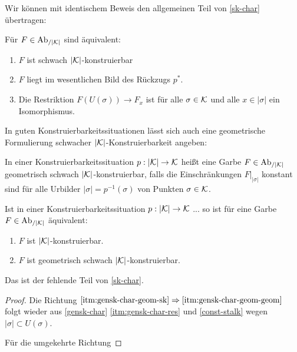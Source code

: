 Wir können mit identischem Beweis den allgemeinen Teil von
\ref{sk-char} übertragen:
\begin{prop} \label{gensk-char}
  Für $F \in \operatorname{Ab}_{/|\mathcal{K}|}$ sind äquivalent:
  \begin{enumerate}[label=(\arabic*)]
  \item \label{itm:gensk-char-sk} $F$ ist schwach $|\mathcal{K}|$-konstruierbar
  \item \label{itm:gensk-char-essim} $F$ liegt im wesentlichen Bild
    des Rückzugs $p^*$.
  \item \label{itm:gensk-char-res} Die Restriktion $F(U(\sigma)) \to
    F_x$ ist für alle $\sigma \in \mathcal{K}$ und alle $x \in |\sigma|$ ein
    Isomorphismus.
  \end{enumerate}
\end{prop}

In guten Konstruierbarkeitssituationen lässt sich auch eine
geometrische Formulierung schwacher $|\mathcal{K}|$-Konstruierbarkeit angeben:
\begin{defn}
  In einer Konstruierbarkeitssituation $p: |\mathcal{K}| \to \mathcal{K}$ heißt eine
  Garbe $F \in \operatorname{Ab}_{/|\mathcal{K}|}$ geometrisch schwach $|\mathcal{K}|$-konstruierbar, falls
  die Einschränkungen $F|_{|\sigma|}$ konstant sind für alle Urbilder
  $|\sigma| = p^{-1}(\sigma)$ von Punkten $\sigma \in \mathcal{K}$.
\end{defn}
\begin{prop} \label{gensk-char-geom}
  Ist in einer Konstruierbarkeitssituation $p: |\mathcal{K}| \to \mathcal{K}$ ...  so
  ist für eine Garbe $F \in \operatorname{Ab}_{/|\mathcal{K}|}$ äquivalent:
  \begin{enumerate}
    \item \label{itm:gensk-char-geom-sk} $F$ ist $|\mathcal{K}|$-konstruierbar.
    \item \label{itm:gensk-char-geom-geom} $F$ ist geometrisch schwach
      $|\mathcal{K}|$-konstruierbar.
  \end{enumerate}
  \end{prop}
Das ist der fehlende Teil von \ref{sk-char}.
\begin{proof}
  Die Richtung $\ref{itm:gensk-char-geom-sk} \Rightarrow
  \ref{itm:gensk-char-geom-geom}$ folgt wieder aus \ref{gensk-char}
  \ref{itm:gensk-char-res} und \ref{const-stalk} wegen $|\sigma|
  \subset U(\sigma)$.

  Für die umgekehrte Richtung %
\end{proof}


